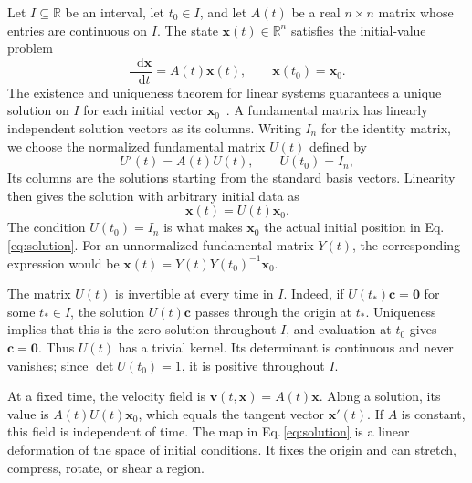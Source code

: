 \documentclass[a4paper,11pt]{article}
\newcommand{\R}{\mathbb{R}}
\newcommand{\dd}{\mathop{}\!\mathrm{d}}
\newcommand{\vect}[1]{\boldsymbol{#1}}
\numberwithin{equation}{section}
\begin{document}
Let $I\subseteq\R$ be an interval, let $t_0\in I$, and let $A(t)$ be a real
$n\times n$ matrix whose entries are continuous on $I$. The state
$\vect{x}(t)\in\R^n$ satisfies the initial-value problem
\begin{equation}
  \frac{\dd\vect{x}}{\dd t}=A(t)\vect{x}(t),
  \qquad \vect{x}(t_0)=\vect{x}_0.
  \label{eq:system}
\end{equation}
The existence and uniqueness theorem for linear systems guarantees a unique
solution on $I$ for each initial vector $\vect{x}_0$~\cite[Sec.~3.4]{Teschl2012}.
A fundamental matrix has linearly independent solution vectors as its
columns. Writing $I_n$ for the identity matrix, we choose the normalized
fundamental matrix $U(t)$ defined by
\begin{equation}
  U'(t)=A(t)U(t),
  \qquad U(t_0)=I_n,
  \label{eq:fundamental}
\end{equation}
Its columns are the solutions starting
from the standard basis vectors. Linearity then gives the solution with
arbitrary initial data as
\begin{equation}
  \vect{x}(t)=U(t)\vect{x}_0.
  \label{eq:solution}
\end{equation}
The condition $U(t_0)=I_n$ is what makes $\vect{x}_0$ the actual initial
position in Eq.\,\eqref{eq:solution}. For an unnormalized fundamental matrix
$Y(t)$, the corresponding expression would be
$\vect{x}(t)=Y(t)Y(t_0)^{-1}\vect{x}_0$.

The matrix $U(t)$ is invertible at every time in $I$. Indeed, if
$U(t_*)\vect{c}=\vect{0}$ for some $t_*\in I$, the solution
$U(t)\vect{c}$ passes through the origin at $t_*$. Uniqueness implies that
this is the zero solution throughout $I$, and evaluation at $t_0$ gives
$\vect{c}=\vect{0}$. Thus $U(t)$ has a trivial kernel. Its determinant is
continuous and never vanishes; since $\det U(t_0)=1$, it is positive
throughout $I$.

At a fixed time, the velocity field is $\vect{v}(t,\vect{x})=A(t)\vect{x}$.
Along a solution, its value is $A(t)U(t)\vect{x}_0$, which equals the tangent
vector $\vect{x}'(t)$. If $A$ is constant, this field is independent of time.
The map in Eq.\,\eqref{eq:solution} is a linear deformation of the space of
initial conditions. It fixes the origin and can stretch, compress, rotate,
or shear a region.
\end{document}

